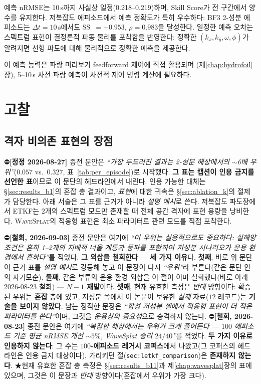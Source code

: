 \documentclass[11pt]{report}
\numberwithin{equation}{chapter}
\numberwithin{figure}{chapter}
\numberwithin{table}{chapter}
\newcommand{\WS}{\textsc{WaveSplat}}
\begin{document}
예측 nRMSE는 10\,s까지 사실상 일정(0.218--0.219)하며,
Skill Score가 전 구간에서 양수를 유지한다.
저복잡도 에피소드에서 예측 정확도가 특히 우수하다:
BF3 2-성분 에피소드는 $\Delta t = 10$\,s에서도
SS~$=+0.953$, $\rho=0.983$을 달성한다.
일정한 예측 오차는 스펙트럼 표현이 결정론적 파동 물리를
포착함을 반영한다: 정확한 $(k_x, k_y, \omega, \phi)$가
알려지면 선형 파도에 대해 물리적으로 정확한 예측을 제공한다.

이 예측 능력은 파랑 미리보기 feedforward 제어에 직접 활용되며
(제\ref{chap:hydrofoil}장), 5--10\,s 사전 파랑 예측이 사전적
제어 명령 계산에 필요하다.

\section{고찰}
\label{sec:discussion_ws}

\subsection{격자 비의존 표현의 장점}

⛔\textbf{[정정 2026-08-27]} 종전 문안은 \emph{``가장 두드러진 결과는 2-성분 해상에서의
$\sim$6배 우위''}($0.057$ vs.\ $0.327$, 표~\ref{tab:per_episode})로 시작했다.
\textbf{그 표는 캡션이 인용 금지를 선언한 표}이므로 이 문단의 헤드라인에서 내린다.
인용 가능한 대체는 \S\ref{sec:results_b1}의 혼잡 층 결과이고,
\emph{표현}에 대한 귀속은 \S\ref{sec:ablation_k}의 절제가 담당한다.
아래 서술은 그 표를 근거가 아니라 \emph{설명 예시}로 쓴다.
저복잡도 파도장에서 ETKF는 2개의 스펙트럼 모드만 존재할 때
전체 공간 격자에 표현 용량을 낭비한다.
\WS{}의 적응형 표현은 최소 파라미터로 관련 모드를 직접 포착한다.

⛔\textbf{[철회, 2026-09-03]} 종전 문안은 여기에 \emph{``이 우위는 실용적으로도
중요하다: 실해양 조건은 흔히 1--2개의 지배적 너울 계통과 풍파를 포함하여 저성분
시나리오가 운용 환경에서 흔하다''}를 적었다. \textbf{그 외삽을 철회한다} ---
\textbf{세 가지 이유}다. \textbf{첫째}, 바로 위 문단이 근거 표를 \emph{설명 예시}로
강등해 놓고 이 문장이 다시 \emph{``우위''}라 부른다(같은 문단 안의 자기모순).
\textbf{둘째}, 같은 부류의 운용 환경 외삽을 이 절이 이미 철회했다(바로 아래
2026-08-23 철회) --- \textbf{$N-1$ 재발}이다. \textbf{셋째}, 현재 유효한 측정은
\emph{반대} 방향이다: 확증된 우위는 \textbf{혼잡} 층에 있고, 저성분 쪽에서 이
논문이 보유한 \emph{실제} 자료($12$ 레코드)는 \textbf{기술을 보이지 않았다}.
남는 정직한 문장은 \emph{``합성 저성분 셀에서 적응형 표현이 더 적은 파라미터를
쓴다''}이며, 그것을 \emph{운용상의 중요성}으로 승격하지 않는다.
⛔\textbf{[철회, 2026-08-23]} 종전 문안은 여기에 \emph{``복잡한 해상에서는 우위가
크게 줄어든다 --- $100$ 에피소드 기준 평균 nRMSE 개선 ${\sim}5\%$, WaveSplat 승리
$24/40$''}를 적었다. \textbf{두 가지 이유로 인용하지 않는다}: 그 수는
\textbf{$100$-에피소드 레거시 코퍼스}에서 나왔고(그 코퍼스의 헤드라인은 인용 금지 대상이다),
가리키던 절(\texttt{sec:letkf\_comparison})은 \textbf{존재하지 않는다}.
★현재 유효한 혼잡 층 측정은 \S\ref{sec:results_b11}과 제\ref{chap:wavesplat}장의
표에 있으며, 그것은 이 문장과 \emph{반대} 방향이다(혼잡에서 우위가 가장 크다).
\end{document}
